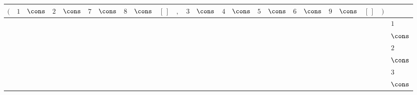 {\scriptsize\setlength{\tabcolsep}{1.5pt}%
\begin{tabular}{ccccccccccccccccccccccc|l}
$($ & $1$ & $\cons$ & $2$ & $\cons$ & $7$ & $\cons$ & $8$ & $\cons$ & $[\,]$ & $,$ & $3$ & $\cons$ & $4$ & $\cons$ & $5$ & $\cons$ & $6$ & $\cons$ & $9$ & $\cons$ & $[\,]$ & $)$ & \\ \hline
\gcell{$$} & \gcell{$\posD{\bullet}$} & \gcell{$\posC{\circ}$} & \gcell{$$} & \gcell{$$} & \gcell{$$} & \gcell{$$} & \gcell{$$} & \gcell{$$} & \gcell{$$} & \gcell{$\posC{\circ}$} & \gcell{$\posC{\circ}$} & \gcell{$\posC{\circ}$} & \gcell{$$} & \gcell{$$} & \gcell{$$} & \gcell{$$} & \gcell{$$} & \gcell{$$} & \gcell{$$} & \gcell{$$} & \gcell{$$} & \gcell{$$} & $1$ \\
\gcell{$$} & \gcell{$\posC{\circ}$} & \gcell{$\posC{\circ}$} & \gcell{$$} & \gcell{$$} & \gcell{$$} & \gcell{$$} & \gcell{$$} & \gcell{$$} & \gcell{$$} & \gcell{$\posC{\circ}$} & \gcell{$\posC{\circ}$} & \gcell{$\posC{\circ}$} & \gcell{$$} & \gcell{$$} & \gcell{$$} & \gcell{$$} & \gcell{$$} & \gcell{$$} & \gcell{$$} & \gcell{$$} & \gcell{$$} & \gcell{$$} & $\cons$ \\
\gcell{$$} & \gcell{$\posC{\circ}$} & \gcell{$\posC{\circ}$} & \gcell{$\posD{\bullet}$} & \gcell{$\posC{\circ}$} & \gcell{$$} & \gcell{$$} & \gcell{$$} & \gcell{$$} & \gcell{$$} & \gcell{$\posC{\circ}$} & \gcell{$\posC{\circ}$} & \gcell{$\posC{\circ}$} & \gcell{$$} & \gcell{$$} & \gcell{$$} & \gcell{$$} & \gcell{$$} & \gcell{$$} & \gcell{$$} & \gcell{$$} & \gcell{$$} & \gcell{$$} & $2$ \\
\gcell{$$} & \gcell{$\posC{\circ}$} & \gcell{$\posC{\circ}$} & \gcell{$\posC{\circ}$} & \gcell{$\posC{\circ}$} & \gcell{$$} & \gcell{$$} & \gcell{$$} & \gcell{$$} & \gcell{$$} & \gcell{$\posC{\circ}$} & \gcell{$\posC{\circ}$} & \gcell{$\posC{\circ}$} & \gcell{$$} & \gcell{$$} & \gcell{$$} & \gcell{$$} & \gcell{$$} & \gcell{$$} & \gcell{$$} & \gcell{$$} & \gcell{$$} & \gcell{$$} & $\cons$ \\
\gcell{$$} & \gcell{$\posC{\circ}$} & \gcell{$\posC{\circ}$} & \gcell{$\posC{\circ}$} & \gcell{$\posC{\circ}$} & \gcell{$\posC{\circ}$} & \gcell{$\posC{\circ}$} & \gcell{$$} & \gcell{$$} & \gcell{$$} & \gcell{$\posC{\circ}$} & \gcell{$\posD{\bullet}$} & \gcell{$\posC{\circ}$} & \gcell{$$} & \gcell{$$} & \gcell{$$} & \gcell{$$} & \gcell{$$} & \gcell{$$} & \gcell{$$} & \gcell{$$} & \gcell{$$} & \gcell{$$} & $3$ \\
\gcell{$$} & \gcell{$\posC{\circ}$} & \gcell{$\posC{\circ}$} & \gcell{$\posC{\circ}$} & \gcell{$\posC{\circ}$} & \gcell{$\posC{\circ}$} & \gcell{$\posC{\circ}$} & \gcell{$$} & \gcell{$$} & \gcell{$$} & \gcell{$\posC{\circ}$} & \gcell{$\posC{\circ}$} & \gcell{$\posC{\circ}$} & \gcell{$$} & \gcell{$$} & \gcell{$$} & \gcell{$$} & \gcell{$$} & \gcell{$$} & \gcell{$$} & \gcell{$$} & \gcell{$$} & \gcell{$$} & $\cons$ \\

\end{tabular}}
